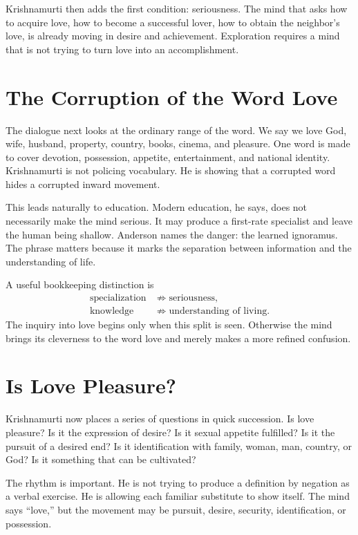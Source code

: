 Krishnamurti then adds the first condition: seriousness. The mind that asks how to acquire love, how to become a successful lover, how to obtain the neighbor's love, is already moving in desire and achievement. Exploration requires a mind that is not trying to turn love into an accomplishment.

\section{The Corruption of the Word Love}

The dialogue next looks at the ordinary range of the word. We say we love God, wife, husband, property, country, books, cinema, and pleasure. One word is made to cover devotion, possession, appetite, entertainment, and national identity. Krishnamurti is not policing vocabulary. He is showing that a corrupted word hides a corrupted inward movement.

This leads naturally to education. Modern education, he says, does not necessarily make the mind serious. It may produce a first-rate specialist and leave the human being shallow. Anderson names the danger: the learned ignoramus. The phrase matters because it marks the separation between information and the understanding of life.

A useful bookkeeping distinction is
\begin{align}
\text{specialization} &\not\Longrightarrow \text{seriousness},\\
\text{knowledge} &\not\Longrightarrow \text{understanding of living}.
\end{align}
The inquiry into love begins only when this split is seen. Otherwise the mind brings its cleverness to the word love and merely makes a more refined confusion.

\section{Is Love Pleasure?}

Krishnamurti now places a series of questions in quick succession. Is love pleasure? Is it the expression of desire? Is it sexual appetite fulfilled? Is it the pursuit of a desired end? Is it identification with family, woman, man, country, or God? Is it something that can be cultivated?

The rhythm is important. He is not trying to produce a definition by negation as a verbal exercise. He is allowing each familiar substitute to show itself. The mind says ``love,'' but the movement may be pursuit, desire, security, identification, or possession.

